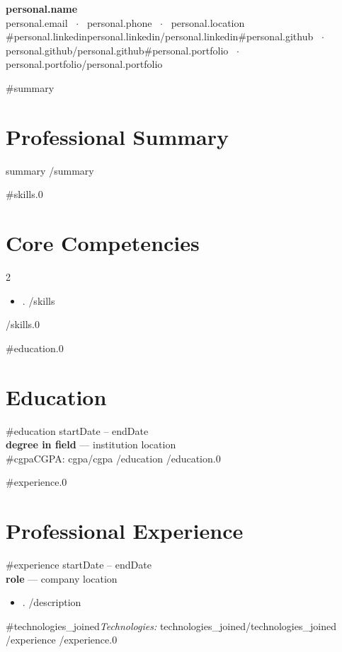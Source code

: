 \documentclass[11pt,a4paper]{article}
\begin{document}
{\centering
    {\LARGE\bfseries {{personal.name}}}\\[6pt]
    {{personal.email}} \, $\cdot$ \, {{personal.phone}} \, $\cdot$ \, {{personal.location}}\\
    {{#personal.linkedin}}{{personal.linkedin}}{{/personal.linkedin}}{{#personal.github}} \, $\cdot$ \, {{personal.github}}{{/personal.github}}{{#personal.portfolio}} \, $\cdot$ \, {{personal.portfolio}}{{/personal.portfolio}}
\par}

{{#summary}}
\section{Professional Summary}
 {{summary}}
{{/summary}}

{{#skills.0}}
\section{Core Competencies}
\begin{multicols}{2}
\begin{itemize}[leftmargin=*,nosep]
 {{#skills}}
    \item {{.}}
 {{/skills}}
\end{itemize}
\end{multicols}
{{/skills.0}}

{{#education.0}}
\section{Education}
 {{#education}}
\hfill {{startDate}} -- {{endDate}}\\
\textbf{ {{degree}} in {{field}} } --- {{institution}} \hfill {{location}}\\
{{#cgpa}}CGPA: {{cgpa}}{{/cgpa}}
 {{/education}}
{{/education.0}}

{{#experience.0}}
\section{Professional Experience}
 {{#experience}}
\hfill {{startDate}} -- {{endDate}}\\
\textbf{ {{role}} } --- {{company}} \hfill {{location}}
\begin{itemize}[leftmargin=*,nosep]
 {{#description}}
    \item {{.}}
 {{/description}}
\end{itemize}
 {{#technologies_joined}}\textit{Technologies:} {{technologies_joined}}{{/technologies_joined}}
 {{/experience}}
{{/experience.0}}
\end{document}
